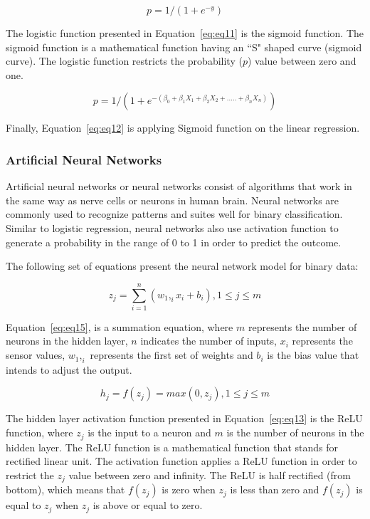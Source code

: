 \documentclass[runningheads]{llncs}
\begin{document}
\begin{equation}
\label{eq:eq11}
p = 1/(1 + e^{-y})
\end{equation}

The logistic function presented in Equation~\ref{eq:eq11} is the sigmoid function. The sigmoid function is a mathematical function having an ``S" shaped curve (sigmoid curve). The logistic function restricts the probability ($p$) value between zero and one.

\begin{equation}
\label{eq:eq12}
p = 1/(1 + e^{-(\beta_0 + \beta_1 X_1 + \beta_2 X_2 + ..... + \beta_n X_n)})
\end{equation}

Finally, Equation~\ref{eq:eq12} is applying Sigmoid function on the linear regression.

\subsubsection {Artificial Neural Networks}
\label{sec:NW}
Artificial neural networks or neural networks consist of algorithms that work in the same way as nerve cells or neurons in human brain. Neural networks are commonly used to recognize patterns and suites well for binary classification. Similar to logistic regression, neural networks also use activation function to generate a probability in the range of 0 to 1 in order to predict the outcome. 

The following set of equations present the neural network model for binary data:

\begin{equation}
\label{eq:eq15}
z_j = \sum_{i=1}^{n} (w_1,_ix_i + b_i),  1 \leq j \leq m
\end{equation}

Equation~\ref{eq:eq15}, is a summation equation, where $m$ represents the number of neurons in the hidden layer, $n$ indicates the number of inputs, $x_i$ represents the sensor values, $w_1,_i$ represents the first set of weights and $b_i$ is the bias value that intends to adjust the output.

\begin{equation}
\label{eq:eq13}
h_j = f(z_j) = max(0, z_j), 1 \leq j \leq m
\end{equation}

The hidden layer activation function presented in Equation~\ref{eq:eq13} is the ReLU function, where $z_j$ is the input to a neuron and $m$ is the number of neurons in the hidden layer. The ReLU function is a mathematical function that stands for rectified linear unit. The activation function applies a ReLU function in order to restrict the $z_j$ value between zero and infinity. The ReLU is half rectified (from bottom), which means that $f(z_j)$ is zero when $z_j$ is less than zero and $f(z_j)$ is equal to $z_j$ when $z_j$ is above or equal to zero.
\end{document}
